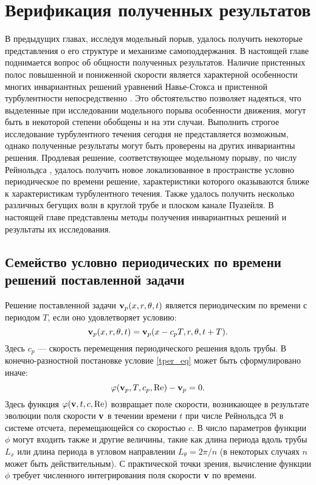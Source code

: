
\chapter{Верификация полученных результатов}


В предыдущих главах, исследуя модельный порыв, удалось получить некоторые представления о его структуре и механизме самоподдержания. В настоящей главе поднимается вопрос об общности полученных результатов. Наличие пристенных полос повышенной и пониженной скорости является характерной особенности многих инвариантных решений уравнений Навье-Стокса \cite{Kawahara2012} и пристенной турбулентности непосредственно \cite{Kline1967, Smith1983, Schoppa2002}. Это обстоятельство позволяет надеяться, что выделенные при исследовании модельного порыва особенности движения, могут быть в некоторой степени обобщены и на эти случаи. Выполнить строгое исследование турбулентного течения сегодня не представляется возможным, однако полученные результаты могут быть проверены на других инвариантны решения. Продлевая решение, соответствующее модельному порыву, по числу Рейнольдса \cite{Sanchez2004, Viswanath2007, Dijkstra2014}, удалось получить новое локализованное в пространстве условно периодическое по времени решение, характеристики которого оказываются ближе к характеристикам турбулентного течения. Также удалось получить несколько различных бегущих волн в круглой трубе и плоском канале Пуазейля. В настоящей главе представлены методы получения инвариантных решений и результаты их исследования. 


\section{Семейство условно периодических по времени решений поставленной задачи}

Решение поставленной задачи $\mathbf{v}_p(x,r,\theta,t)$ является периодическим по времени с периодом $T$, если оно удовлетворяет условию:
\begin{equation} \label{tper_eq}
\mathbf{v}_p(x,r,\theta,t) = \mathbf{v}_p(x - c_p T, r, \theta, t + T).
\end{equation}
Здесь $c_p$ --- скорость перемещения периодического решения вдоль трубы. В конечно-разностной постановке условие \eqref{tper_eq} может быть сформулировано иначе:
\begin{equation}\label{P_eq}
\varphi(\mathbf{v}_p, T, c_p, \operatorname{Re}) - \mathbf{v}_p = 0.
\end{equation}
Здесь функция $\varphi(\mathbf{v}, t, c, \operatorname{Re})$ возвращает поле скорости, возникающее в результате эволюции поля скорости $\mathbf{v}$ в течении времени $t$ при числе Рейнольдса $\Re$ в системе отсчета, перемещающейся со скоростью $c$. В число параметров функции $\phi$ могут входить также и другие величины, такие как длина периода вдоль трубы $L_x$ или длина периода в угловом направлении $L_{\theta} = 2\pi/n$ (в некоторых случаях $n$ может быть действительным). С практической точки зрения, вычисление функции $\phi$ требует численного интегрирования поля скорости $\mathbf{v}$ по времени. 

